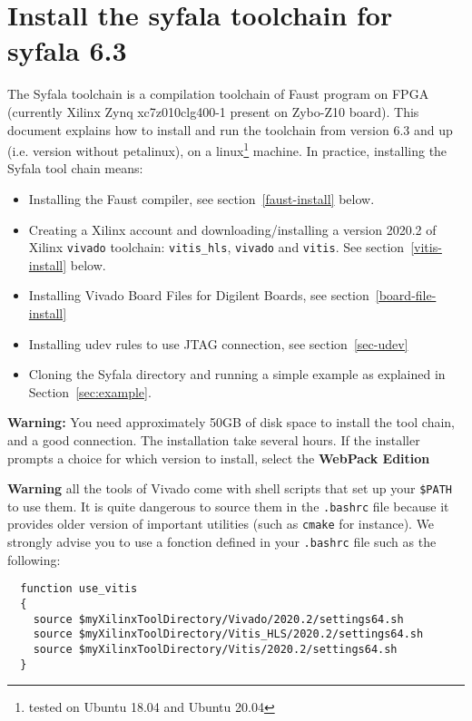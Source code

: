 \section{Install the syfala toolchain for syfala 6.3}
\label{annex}
\label{install}
The Syfala toolchain is a compilation toolchain of Faust program on FPGA (currently Xilinx Zynq xc7z010clg400-1 present on Zybo-Z10 board). This document explains how to install and run the toolchain from version 6.3 and up (i.e. version without petalinux), on a linux\footnote{tested on Ubuntu 18.04 and Ubuntu 20.04} machine. In practice, installing the Syfala tool chain  means:
\begin{itemize}
\item Installing the Faust compiler, see section~\ref{faust-install} below.
\item Creating a Xilinx account and downloading/installing a  version 2020.2 of Xilinx {\tt vivado} toolchain: {\tt vitis\_hls}, {\tt vivado} and {\tt vitis}. See section~\ref{vitis-install} below.
\item Installing Vivado Board Files for Digilent Boards, see section~\ref{board-file-install}
\item Installing udev rules to use JTAG connection, see section~\ref{sec-udev}  
\item Cloning the Syfala directory and running a simple example as explained in Section~\ref{sec:example}.
\end{itemize}

      {\bf Warning:} You need approximately 50GB of disk space to install the tool chain, and a good connection. The installation take several hours. If the installer prompts a choice for which version to install, select the {\bf WebPack Edition} 
           
{\bf Warning} all the tools of Vivado come with shell scripts that set up your {\tt \$PATH} to use them. It is quite dangerous to source them in the {\tt .bashrc} file because it provides older version of important utilities (such as {\tt cmake} for instance). We strongly advise you to use a fonction defined in your {\tt .bashrc} file such as the following:
~\\

\begin{boxedminipage}{\textwidth}
\begin{verbatim}
  function use_vitis
  {
    source $myXilinxToolDirectory/Vivado/2020.2/settings64.sh
    source $myXilinxToolDirectory/Vitis_HLS/2020.2/settings64.sh
    source $myXilinxToolDirectory/Vitis/2020.2/settings64.sh
  }
\end{verbatim}
\end{boxedminipage}

